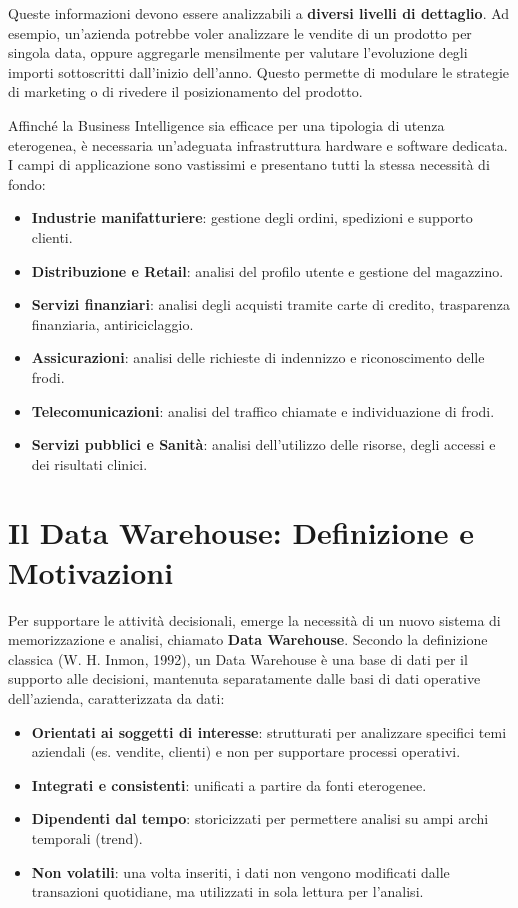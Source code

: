 Queste informazioni devono essere analizzabili a \textbf{diversi livelli di dettaglio}. Ad esempio, un'azienda potrebbe voler analizzare le vendite di un prodotto per singola data, oppure aggregarle mensilmente per valutare l'evoluzione degli importi sottoscritti dall'inizio dell'anno. Questo permette di modulare le strategie di marketing o di rivedere il posizionamento del prodotto.

Affinché la Business Intelligence sia efficace per una tipologia di utenza eterogenea, è necessaria un'adeguata infrastruttura hardware e software dedicata. I campi di applicazione sono vastissimi e presentano tutti la stessa necessità di fondo:
\begin{itemize}
\item \textbf{Industrie manifatturiere}: gestione degli ordini, spedizioni e supporto clienti.
\item \textbf{Distribuzione e Retail}: analisi del profilo utente e gestione del magazzino.
\item \textbf{Servizi finanziari}: analisi degli acquisti tramite carte di credito, trasparenza finanziaria, antiriciclaggio.
\item \textbf{Assicurazioni}: analisi delle richieste di indennizzo e riconoscimento delle frodi.
\item \textbf{Telecomunicazioni}: analisi del traffico chiamate e individuazione di frodi.
\item \textbf{Servizi pubblici e Sanità}: analisi dell'utilizzo delle risorse, degli accessi e dei risultati clinici.
\end{itemize}

\section{Il Data Warehouse: Definizione e Motivazioni}

Per supportare le attività decisionali, emerge la necessità di un nuovo sistema di memorizzazione e analisi, chiamato \textbf{Data Warehouse}.
Secondo la definizione classica (W. H. Inmon, 1992), un Data Warehouse è una base di dati per il supporto alle decisioni, mantenuta separatamente dalle basi di dati operative dell'azienda, caratterizzata da dati:
\begin{itemize}
\item \textbf{Orientati ai soggetti di interesse}: strutturati per analizzare specifici temi aziendali (es. vendite, clienti) e non per supportare processi operativi.
\item \textbf{Integrati e consistenti}: unificati a partire da fonti eterogenee.
\item \textbf{Dipendenti dal tempo}: storicizzati per permettere analisi su ampi archi temporali (trend).
\item \textbf{Non volatili}: una volta inseriti, i dati non vengono modificati dalle transazioni quotidiane, ma utilizzati in sola lettura per l'analisi.
\end{itemize}


